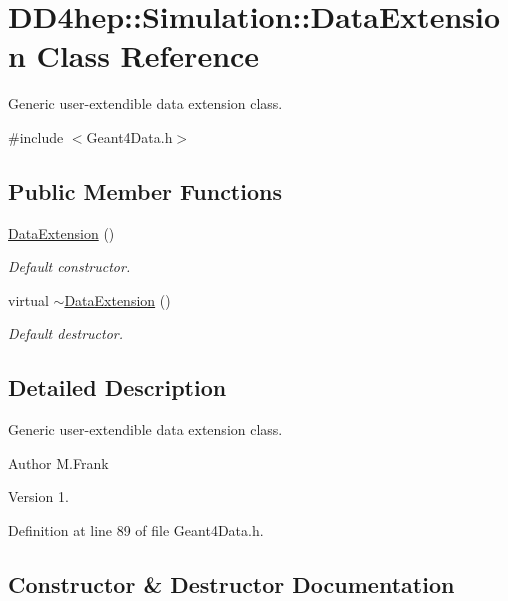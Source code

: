 \hypertarget{class_d_d4hep_1_1_simulation_1_1_data_extension}{}\section{D\+D4hep\+:\+:Simulation\+:\+:Data\+Extension Class Reference}
\label{class_d_d4hep_1_1_simulation_1_1_data_extension}


Generic user-\/extendible data extension class.  




{\ttfamily \#include $<$Geant4\+Data.\+h$>$}

\subsection*{Public Member Functions}
\begin{DoxyCompactItemize}
\item 
\hyperlink{class_d_d4hep_1_1_simulation_1_1_data_extension_a404504756d040999b53938a61bcb2f53}{Data\+Extension} ()
\begin{DoxyCompactList}\small\item\em Default constructor. \end{DoxyCompactList}\item 
virtual \hyperlink{class_d_d4hep_1_1_simulation_1_1_data_extension_a088b1be47c96c8b6ab44527bfa1f60bc}{$\sim$\+Data\+Extension} ()
\begin{DoxyCompactList}\small\item\em Default destructor. \end{DoxyCompactList}\end{DoxyCompactItemize}


\subsection{Detailed Description}
Generic user-\/extendible data extension class. 

\begin{DoxyAuthor}{Author}
M.\+Frank 
\end{DoxyAuthor}
\begin{DoxyVersion}{Version}
1. 
\end{DoxyVersion}


Definition at line 89 of file Geant4\+Data.\+h.



\subsection{Constructor \& Destructor Documentation}
\hypertarget{class_d_d4hep_1_1_simulation_1_1_data_extension_a404504756d040999b53938a61bcb2f53}{}\label{class_d_d4hep_1_1_simulation_1_1_data_extension_a404504756d040999b53938a61bcb2f53} 
